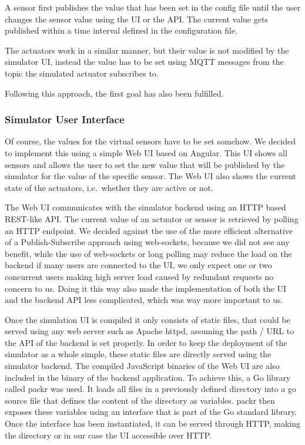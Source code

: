 A sensor first publishes the value that has been set in the config file
until the user changes the sensor value using the UI or the API. The
current value gets published within a time interval defined in the
configuration file.

The actuators work in a similar manner, but their value is not modified
by the simulator UI, instead the value has to be set using MQTT messages
from the topic the simulated actuator subscribes to.

Following this approach, the first goal has also been fulfilled.

\subsubsection{Simulator User Interface}\label{subsubsec:ui}

Of course, the values for the virtual sensors have to be set somehow. We
decided to implement this using a simple Web UI based on Angular. This
UI shows all sensors and allows the user to set the new value that will
be published by the simulator for the value of the specific sensor. The
Web UI also shows the current state of the actuators, i.e.~whether they
are active or not.

The Web UI communicates with the simulator backend using an HTTP based
REST-like API. The current value of an actuator or sensor is retrieved
by polling an HTTP endpoint.
We decided against the use of the more
efficient alternative of a Publish-Subscribe approach using web-sockets,
because we did not see any benefit, while the use of web-sockets or long
polling may reduce the load on the backend if many users are connected
to the UI, we only expect one or two concurrent users making high server
load caused by redundant requests no concern to us.
Doing it this way
also made the implementation of both the UI and the backend API less
complicated, which was way more important to us.

Once the simulation UI is compiled it only consists of static files,
that could be served using any web server such as Apache httpd, assuming
the path / URL to the API of the backend is set properly.
In order to
keep the deployment of the simulator as a whole simple, these static
files are directly served using the simulator backend.
The compiled
JavaScript binaries of the Web UI are also included in the binary of the
backend application.
To achieve this, a Go library called packr was
used.
It loads all files in a previously defined directory into a go
source file that defines the content of the directory as variables.
packr then exposes these variables using an interface that is part of
the Go standard library.
Once the interface has been instantiated, it
can be served through HTTP, making the directory or in our case the UI
accessible over HTTP.

